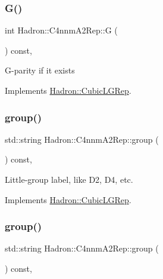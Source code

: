 \subsubsection{\texorpdfstring{G()}{G()}\hspace{0.1cm}{\footnotesize\ttfamily [3/3]}}
{\footnotesize\ttfamily int Hadron\+::\+C4nnm\+A2\+Rep\+::G (\begin{DoxyParamCaption}{ }\end{DoxyParamCaption}) const\hspace{0.3cm}{\ttfamily [inline]}, {\ttfamily [virtual]}}

G-\/parity if it exists 

Implements \mbox{\hyperlink{structHadron_1_1CubicLGRep_ace26f7b2d55e3a668a14cb9026da5231}{Hadron\+::\+Cubic\+L\+G\+Rep}}.

\mbox{\label{structHadron_1_1C4nnmA2Rep_ae6a2ff8ed8fcc3e34ed1e46e493195ed}} 
\subsubsection{\texorpdfstring{group()}{group()}\hspace{0.1cm}{\footnotesize\ttfamily [1/5]}}
{\footnotesize\ttfamily std\+::string Hadron\+::\+C4nnm\+A2\+Rep\+::group (\begin{DoxyParamCaption}{ }\end{DoxyParamCaption}) const\hspace{0.3cm}{\ttfamily [inline]}, {\ttfamily [virtual]}}

Little-\/group label, like D2, D4, etc. 

Implements \mbox{\hyperlink{structHadron_1_1CubicLGRep_a9bdb14b519a611d21379ed96a3a9eb41}{Hadron\+::\+Cubic\+L\+G\+Rep}}.

\mbox{\label{structHadron_1_1C4nnmA2Rep_ae6a2ff8ed8fcc3e34ed1e46e493195ed}} 
\subsubsection{\texorpdfstring{group()}{group()}\hspace{0.1cm}{\footnotesize\ttfamily [2/5]}}
{\footnotesize\ttfamily std\+::string Hadron\+::\+C4nnm\+A2\+Rep\+::group (\begin{DoxyParamCaption}{ }\end{DoxyParamCaption}) const\hspace{0.3cm}{\ttfamily [inline]}, {\ttfamily [virtual]}}

